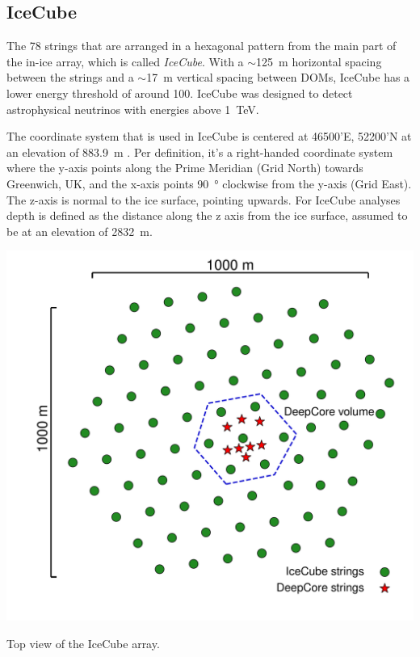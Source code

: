 \subsection{IceCube}

The 78 strings that are arranged in a hexagonal pattern from the main part of the in-ice array, which is called \textit{IceCube}. With a $\sim$\SI{125}{\meter} horizontal spacing between the strings and a $\sim$\SI{17}{\meter} vertical spacing between DOMs, IceCube has a lower energy threshold of around \SI{100}{\gev}. IceCube was designed to detect astrophysical neutrinos with energies above \SI{1}{\tera\electronvolt}.

The coordinate system that is used in IceCube is centered at 46500'E, 52200'N at an elevation of \SI{883.9}{\meter} . Per definition, it's a right-handed coordinate system where the y-axis points along the Prime Meridian (Grid North) towards Greenwich, UK, and the x-axis points \SI{90}{\degree} clockwise from the y-axis (Grid East). The z-axis is normal to the ice surface, pointing upwards. For IceCube analyses depth is defined as the distance along the z axis from the ice surface, assumed to be at an elevation of \SI{2832}{\meter}.



\begin{marginfigure}
    \includegraphics[trim={2.0cm, 1.5cm, 0, 0}, clip, width=1.0\linewidth]{figures/icecube_deepcore/icecube_top_view_bw.pdf}
    \caption[IceCube top view]{Top view of the IceCube array.}
\end{marginfigure}

